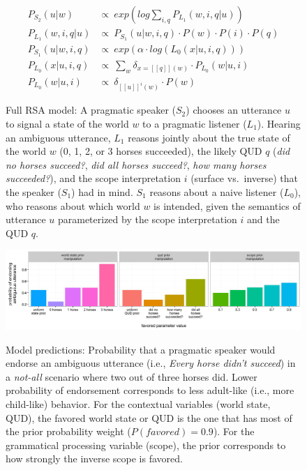 \documentclass[12pt]{article}
\newcommand{\lsp}[1]{\textcolor{violet}{[lsp: #1]}}
\begin{document}
\begin{figure}[H]
  \begin{equation*}
  \begin{aligned}
P_{S_{2}} (u | w) &\propto \ exp(log \sum_{i,q} P_{L_{1}} (w, i, q | u))\\
 P_{L_{1}} (w, i, q | u) &\propto  \ P_{S_{1}} (u | w, i, q) \cdot P(w) \cdot P(i) \cdot P(q)\\
 P_{S_{1}} (u | w, i, q) &\propto  \ exp (\alpha \cdot log(L_{0}(x | u, i, q)))\\
  P_{L_{0}} (x | u, i, q) &\propto \ \sum_{w}\delta_{x=[\! [ q ]\! ](w)} \cdot P_{L_{0}} (w | u, i)\\
  P_{L_{0}} (w | u, i) &\propto \ \delta_{[\![u]\!]^{i}(w)} \cdot P(w)
  \end{aligned}
  \end{equation*}
  \vspace{-1em}
  \caption{Full RSA model: A pragmatic speaker ($S_2$) chooses an utterance $u$ to signal a state of the world $w$ to a pragmatic listener ($L_1$). Hearing an ambiguous utterance, $L_1$ reasons jointly about the true state of the world $w$ (0, 1, 2, or 3 horses succeeded), the likely QUD $q$ (\emph{did no horses succeed?}, \emph{did all horses succeed?}, \emph{how many horses succeeded?}), and the scope interpretation $i$ (surface vs.~inverse) that the speaker ($S_1$) had in mind. $S_1$ reasons about a naive listener ($L_0$), who reasons about which world $w$ is intended, given the semantics of utterance $u$ parameterized by the scope interpretation $i$ and the QUD $q$.}
  \end{figure}

\vspace{-1em}
\begin{figure}[H]
\includegraphics[width = \textwidth]{1.jpg}
\label{fig:graphs}
\vspace{-2em}
\caption{
Model predictions: Probability that a pragmatic speaker would endorse an ambiguous utterance (i.e., \emph{Every horse didn't succeed}) in a 
{\textit{not-all}}
scenario where two out of three horses did. Lower probability of endorsement corresponds to less adult-like (i.e., more child-like) behavior. For the contextual variables (world state, QUD), the favored world state or QUD is the one that has most of the prior probability weight ($P(favored) = 0.9$). For the grammatical processing variable (scope), the prior corresponds to how strongly the inverse scope is favored. }
\end{figure}


\setlength{\bibleftmargin}{.125in}
\setlength{\bibindent}{-\bibleftmargin}


\end{document}
